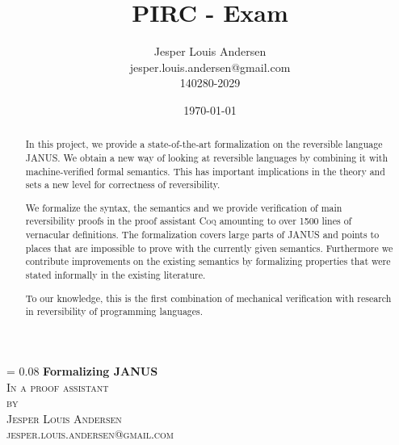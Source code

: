 \documentclass[a4paper, oneside, 10pt, draft]{memoir}
\author{Jesper Louis
  Andersen\\jesper.louis.andersen@gmail.com\\140280-2029}
\title{PIRC - Exam}
\date{\today}
\makeatletter
\renewcommand*{\titleM}{\begingroup%
  \drop = 0.08\textheight
  \centering
  {\Huge\bfseries Formalizing JANUS}\\[\baselineskip]
  {\scshape In a proof assistant}\\[\baselineskip]
  {\scshape by}\\[\baselineskip]
  {\large\scshape Jesper Louis Andersen\\jesper.louis.andersen@gmail.com}\par
  \endgroup}
\makeatother
\begin{document}
\newcommand{\janusz}{$\mathrm{JANUS}_0$}
\newcommand{\januso}{$\mathrm{JANUS}_1$}
\newcommand{\lift}[1]{\lfloor #1 \rfloor}
\newcommand{\coq}{{\scshape Coq}}
\newcommand{\twelf}{{\scshape Twelf}}
\newcommand{\NN}{\mathbb{N}}
\newcommand{\ZZ}{\mathbb{Z}}
\titleM
\begin{abstract}
  In this project, we provide a state-of-the-art formalization on the
  reversible language JANUS. We obtain a
  new way of looking at reversible languages by combining it with
  machine-verified formal semantics. This has important implications
  in the theory and sets a new level for correctness of reversibility.

  We formalize the syntax, the semantics
  and we provide verification of main reversibility proofs in the
  proof assistant \coq{} amounting to over 1500 lines of vernacular
  definitions. The formalization covers large parts of JANUS and
  points to places that are impossible to prove with the currently
  given semantics. Furthermore we contribute improvements on the existing
  semantics by formalizing properties that were stated informally in
  the existing literature.

  To our knowledge, this is the first combination of mechanical
  verification with research in reversibility of programming
  languages.
\end{abstract}
\listoffixmes
\tableofcontents
{}








\appendix

\end{document}
